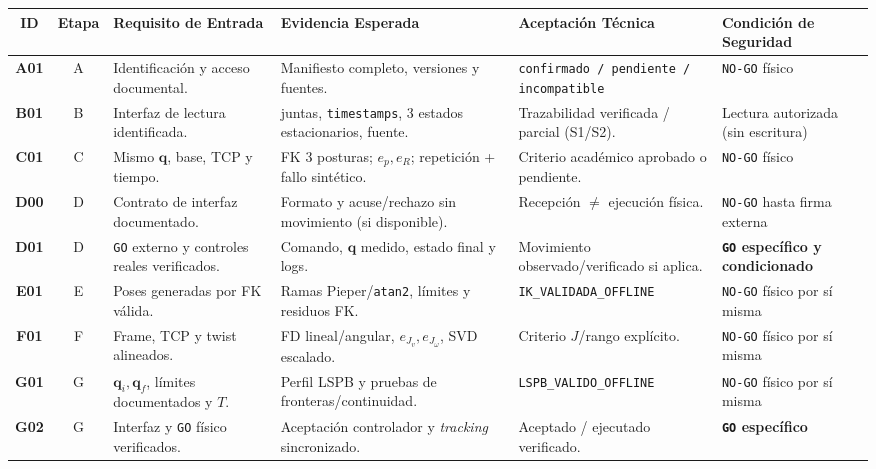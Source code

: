 \documentclass[10pt, a4paper, landscape]{article}
\begin{document}
\noindent\begin{tabularx}{\textwidth}{|c|c|>{\hsize=0.95\hsize\raggedright\arraybackslash}X|>{\hsize=1.15\hsize\raggedright\arraybackslash}X|>{\hsize=1.05\hsize\raggedright\arraybackslash}X|>{\hsize=0.85\hsize\raggedright\arraybackslash}X|}
\hline
\rowcolor{ucbblue!15}
\textbf{ID} & \textbf{Etapa} & \textbf{Requisito de Entrada} & \textbf{Evidencia Esperada} & \textbf{Aceptación Técnica} & \textbf{Condición de Seguridad} \\ \hline
\textbf{A01} & A & Identificación y acceso documental. & Manifiesto completo, versiones y fuentes. & \texttt{confirmado / pendiente / incompatible} & \texttt{NO-GO} físico \\ \hline
\textbf{B01} & B & Interfaz de lectura identificada. & 6 juntas, \texttt{timestamps}, 3 estados estacionarios, fuente. & Trazabilidad verificada / parcial (S1/S2). & Lectura autorizada (sin escritura) \\ \hline
\textbf{C01} & C & Mismo $\mathbf{q}$, base, TCP y tiempo. & FK 3 posturas; $e_p, e_R$; repetición + fallo sintético. & Criterio académico aprobado o pendiente. & \texttt{NO-GO} físico \\ \hline
\textbf{D00} & D & Contrato de interfaz documentado. & Formato y acuse/rechazo sin movimiento (si disponible). & Recepción $\neq$ ejecución física. & \texttt{NO-GO} hasta firma externa \\ \hline
\textbf{D01} & D & \texttt{GO} externo y controles reales verificados. & Comando, $\mathbf{q}$ medido, estado final y logs. & Movimiento observado/verificado si aplica. & \textbf{\texttt{GO} específico y condicionado} \\ \hline
\textbf{E01} & E & Poses generadas por FK válida. & Ramas Pieper/\texttt{atan2}, límites y residuos FK. & \texttt{IK\_VALIDADA\_OFFLINE} & \texttt{NO-GO} físico por sí misma \\ \hline
\textbf{F01} & F & Frame, TCP y twist alineados. & FD lineal/angular, $e_{J_v}, e_{J_\omega}$, SVD escalado. & Criterio $J$/rango explícito. & \texttt{NO-GO} físico por sí misma \\ \hline
\textbf{G01} & G & $\mathbf{q}_i, \mathbf{q}_f$, límites documentados y $T$. & Perfil LSPB y pruebas de fronteras/continuidad. & \texttt{LSPB\_VALIDO\_OFFLINE} & \texttt{NO-GO} físico por sí misma \\ \hline
\textbf{G02} & G & Interfaz y \texttt{GO} físico verificados. & Aceptación controlador y \textit{tracking} sincronizado. & Aceptado / ejecutado verificado. & \textbf{\texttt{GO} específico} \\ \hline
\end{tabularx}\par
\endgroup
\end{document}
